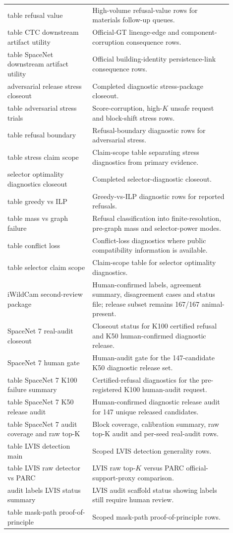 \documentclass[11pt]{article}
\begin{document}
\begin{longtable}{p{0.34\linewidth}p{0.56\linewidth}}
table refusal value & High-volume refusal-value rows for materials follow-up queues. \\
table CTC downstream artifact utility & Official-GT lineage-edge and component-corruption consequence rows. \\
table SpaceNet downstream artifact utility & Official building-identity persistence-link consequence rows. \\
adversarial release stress closeout & Completed diagnostic stress-package closeout. \\
table adversarial stress trials & Score-corruption, high-\(K\) unsafe request and block-shift stress rows. \\
table refusal boundary & Refusal-boundary diagnostic rows for adversarial stress. \\
table stress claim scope & Claim-scope table separating stress diagnostics from primary evidence. \\
selector optimality diagnostics closeout & Completed selector-diagnostic closeout. \\
table greedy vs ILP & Greedy-vs-ILP diagnostic rows for reported refusals. \\
table mass vs graph failure & Refusal classification into finite-resolution, pre-graph mass and selector-power modes. \\
table conflict loss & Conflict-loss diagnostics where public compatibility information is available. \\
table selector claim scope & Claim-scope table for selector optimality diagnostics. \\
iWildCam second-review package & Human-confirmed labels, agreement summary, disagreement cases and status file; release subset remains 167/167 animal-present. \\
SpaceNet 7 real-audit closeout & Closeout status for K100 certified refusal and K50 human-confirmed diagnostic release. \\
SpaceNet 7 human gate & Human-audit gate for the 147-candidate K50 diagnostic release set. \\
table SpaceNet 7 K100 failure summary & Certified-refusal diagnostics for the pre-registered K100 human-audit request. \\
table SpaceNet 7 K50 release audit & Human-confirmed diagnostic release audit for 147 unique released candidates. \\
table SpaceNet 7 audit coverage and raw top-K & Block coverage, calibration summary, raw top-K audit and per-seed real-audit rows. \\
table LVIS detection main & Scoped LVIS detection generality rows. \\
table LVIS raw detector vs PARC & LVIS raw top-\(K\) versus PARC official-support-proxy comparison. \\
audit labels LVIS status summary & LVIS audit scaffold status showing labels still require human review. \\
table mask-path proof-of-principle & Scoped mask-path proof-of-principle rows. \\
\bottomrule
\end{longtable}
\endgroup
\end{document}
